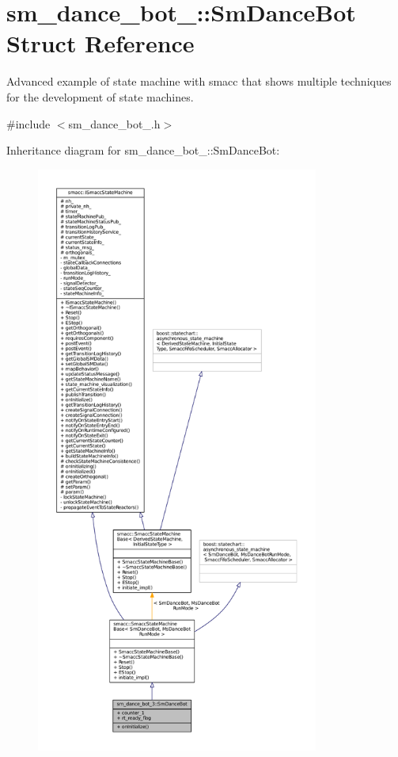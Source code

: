 \hypertarget{structsm__dance__bot__3_1_1SmDanceBot}{}\section{sm\+\_\+dance\+\_\+bot\+\_\+:\+:Sm\+Dance\+Bot Struct Reference}
\label{structsm__dance__bot__3_1_1SmDanceBot}


Advanced example of state machine with smacc that shows multiple techniques for the development of state machines.  




{\ttfamily \#include $<$sm\+\_\+dance\+\_\+bot\+\_.\+h$>$}



Inheritance diagram for sm\+\_\+dance\+\_\+bot\+\_\+:\+:Sm\+Dance\+Bot\+:
\nopagebreak
\begin{figure}[H]
\begin{center}
\leavevmode
\includegraphics[height=550pt]{structsm__dance__bot__3_1_1SmDanceBot__inherit__graph}
\end{center}
\end{figure}



